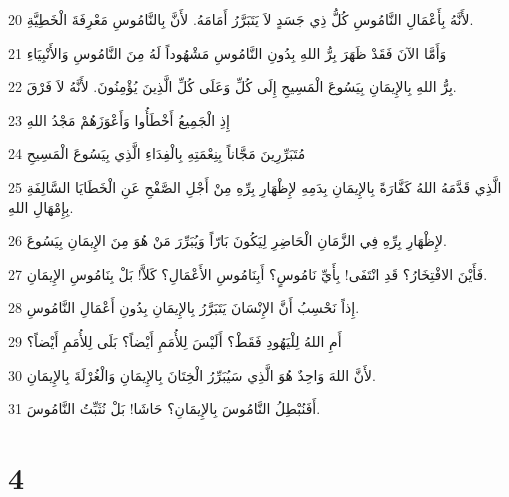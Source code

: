\par 20 لأَنَّهُ بِأَعْمَالِ النَّامُوسِ كُلُّ ذِي جَسَدٍ لاَ يَتَبَرَّرُ أَمَامَهُ. لأَنَّ بِالنَّامُوسِ مَعْرِفَةَ الْخَطِيَّةِ.
\par 21 وَأَمَّا الآنَ فَقَدْ ظَهَرَ بِرُّ اللهِ بِدُونِ النَّامُوسِ مَشْهُوداً لَهُ مِنَ النَّامُوسِ وَالأَنْبِيَاءِ
\par 22 بِرُّ اللهِ بِالإِيمَانِ بِيَسُوعَ الْمَسِيحِ إِلَى كُلِّ وَعَلَى كُلِّ الَّذِينَ يُؤْمِنُونَ. لأَنَّهُ لاَ فَرْقَ.
\par 23 إِذِ الْجَمِيعُ أَخْطَأُوا وَأَعْوَزَهُمْ مَجْدُ اللهِ
\par 24 مُتَبَرِّرِينَ مَجَّاناً بِنِعْمَتِهِ بِالْفِدَاءِ الَّذِي بِيَسُوعَ الْمَسِيحِ
\par 25 الَّذِي قَدَّمَهُ اللهُ كَفَّارَةً بِالإِيمَانِ بِدَمِهِ لإِظْهَارِ بِرِّهِ مِنْ أَجْلِ الصَّفْحِ عَنِ الْخَطَايَا السَّالِفَةِ بِإِمْهَالِ اللهِ.
\par 26 لإِظْهَارِ بِرِّهِ فِي الزَّمَانِ الْحَاضِرِ لِيَكُونَ بَارّاً وَيُبَرِّرَ مَنْ هُوَ مِنَ الإِيمَانِ بِيَسُوعَ.
\par 27 فَأَيْنَ الافْتِخَارُ؟ قَدِ انْتَفَى! بِأَيِّ نَامُوسٍ؟ أَبِنَامُوسِ الأَعْمَالِ؟ كَلاَّ! بَلْ بِنَامُوسِ الإِيمَانِ.
\par 28 إِذاً نَحْسِبُ أَنَّ الإِنْسَانَ يَتَبَرَّرُ بِالإِيمَانِ بِدُونِ أَعْمَالِ النَّامُوسِ.
\par 29 أَمِ اللهُ لِلْيَهُودِ فَقَطْ؟ أَلَيْسَ لِلأُمَمِ أَيْضاً؟ بَلَى لِلأُمَمِ أَيْضاً؟
\par 30 لأَنَّ اللهَ وَاحِدٌ هُوَ الَّذِي سَيُبَرِّرُ الْخِتَانَ بِالإِيمَانِ وَالْغُرْلَةَ بِالإِيمَانِ.
\par 31 أَفَنُبْطِلُ النَّامُوسَ بِالإِيمَانِ؟ حَاشَا! بَلْ نُثَبِّتُ النَّامُوسَ.

\chapter{4}

